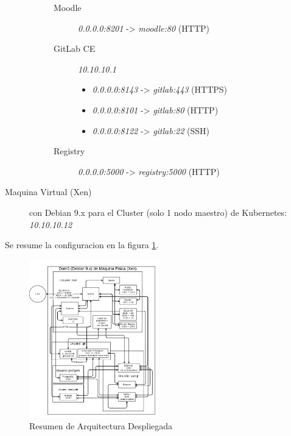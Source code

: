 \begin{description}
\begin{description}
\begin{description}
        	\item[Moodle] \textit{0.0.0.0:8201} -> \textit{moodle:80} (HTTP)
        	\item[GitLab CE] \textit{10.10.10.1}
            \begin{itemize}
            	\item \textit{0.0.0.0:8143} -> \textit{gitlab:443} (HTTPS)
            	\item \textit{0.0.0.0:8101} -> \textit{gitlab:80} (HTTP)
            	\item \textit{0.0.0.0:8122} -> \textit{gitlab:22} (SSH)
            \end{itemize}
            \item[Registry] \textit{0.0.0.0:5000} -> \textit{registry:5000} (HTTP)
        \end{description}
    \end{description}
    \item[Maquina Virtual (Xen)] con Debian 9.x para el Cluster (solo 1 nodo maestro) de Kubernetes: \textit{10.10.10.12}
\end{description}
Se resume la configuracion en la figura \ref{fig:resumen-arq-desp}.
\begin{figure}
	\begin{center}
		\includegraphics[width=0.5\textwidth]{Figures/arq_desp_final_tesis.png}
	\end{center}
    \caption{Resumen de Arquitectura Despliegada}
    \label{fig:resumen-arq-desp}
\end{figure}

